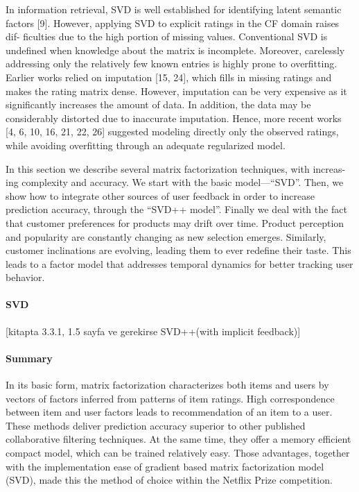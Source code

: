 In information retrieval, SVD is well established for identifying latent semantic factors [9]. However, applying SVD to explicit ratings in the CF domain raises dif- ficulties due to the high portion of missing values. Conventional SVD is undefined when knowledge about the matrix is incomplete. Moreover, carelessly addressing only the relatively few known entries is highly prone to overfitting. Earlier works relied on imputation [15, 24], which fills in missing ratings and makes the rating matrix dense. However, imputation can be very expensive as it significantly increases the amount of data. In addition, the data may be considerably distorted due to inaccurate imputation. Hence, more recent works [4, 6, 10, 16, 21, 22, 26] suggested modeling directly only the observed ratings, while avoiding overfitting through an adequate regularized model.

In this section we describe several matrix factorization techniques, with increas- ing complexity and accuracy. We start with the basic model—“SVD”. Then, we show how to integrate other sources of user feedback in order to increase prediction accuracy, through the “SVD++ model”. Finally we deal with the fact that customer preferences for products may drift over time. Product perception and popularity are constantly changing as new selection emerges. Similarly, customer inclinations are evolving, leading them to ever redefine their taste. This leads to a factor model that addresses temporal dynamics for better tracking user behavior.

\paragraph{SVD}
[kitapta 3.3.1, 1.5 sayfa ve gerekirse SVD++(with implicit feedback)]

\paragraph{Summary}

In its basic form, matrix factorization characterizes both items and users by vectors of factors inferred from patterns of item ratings. High correspondence between item and user factors leads to recommendation of an item to a user. These methods deliver prediction accuracy superior to other published collaborative filtering techniques. At the same time, they offer a memory efficient compact model, which can be trained relatively easy. Those advantages, together with the implementation ease of gradient based matrix factorization model (SVD), made this the method of choice within the Netflix Prize competition.

